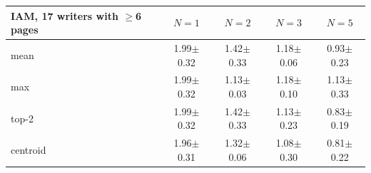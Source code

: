 \begin{tabular}{lcccc}
\toprule
IAM, 17 writers with $\geq$6 pages & $N{=}1$ & $N{=}2$ & $N{=}3$ & $N{=}5$ \\
\midrule
mean & 1.99$\pm$0.32 & 1.42$\pm$0.33 & 1.18$\pm$0.06 & 0.93$\pm$0.23 \\
max & 1.99$\pm$0.32 & 1.13$\pm$0.03 & 1.18$\pm$0.10 & 1.13$\pm$0.33 \\
top-2 & 1.99$\pm$0.32 & 1.42$\pm$0.33 & 1.13$\pm$0.23 & 0.83$\pm$0.19 \\
centroid & 1.96$\pm$0.31 & 1.32$\pm$0.06 & 1.08$\pm$0.30 & 0.81$\pm$0.22 \\
\bottomrule
\end{tabular}
